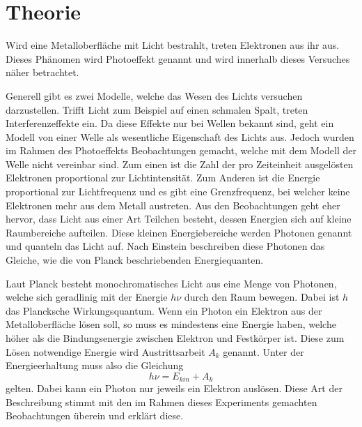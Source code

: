\section{Theorie}
\label{sec:Theorie}
Wird eine Metalloberfläche mit Licht bestrahlt, treten Elektronen aus ihr aus. Dieses Phänomen wird Photoeffekt genannt und wird innerhalb dieses Versuches näher betrachtet.

Generell gibt es zwei Modelle, welche das Wesen des Lichts versuchen darzustellen. Trifft Licht zum Beispiel auf einen schmalen Spalt, treten Interferenzeffekte ein. Da diese Effekte nur bei Wellen bekannt sind, geht ein Modell von einer Welle als wesentliche Eigenschaft des Lichts aus.
Jedoch wurden im Rahmen des Photoeffekts Beobachtungen gemacht, welche mit dem Modell der Welle nicht vereinbar sind. Zum einen ist die Zahl der pro Zeiteinheit ausgelösten Elektronen proportional zur Lichtintensität. Zum Anderen ist die Energie proportional zur Lichtfrequenz und es gibt eine Grenzfrequenz, bei welcher keine Elektronen mehr aus dem Metall austreten. Aus den Beobachtungen geht eher hervor, dass Licht aus einer Art Teilchen besteht, dessen Energien sich auf kleine Raumbereiche aufteilen. Diese kleinen Energiebereiche werden Photonen genannt und quanteln das Licht auf. Nach Einstein beschreiben diese Photonen das Gleiche, wie die von Planck beschriebenden Energiequanten. 

Laut Planck besteht monochromatisches Licht aus eine Menge von Photonen, welche sich geradlinig mit der Energie $h\nu$ durch den Raum bewegen. Dabei ist $h$ das Plancksche Wirkungsquantum. Wenn ein Photon ein Elektron aus der Metalloberfläche lösen soll, so muss es mindestens eine Energie haben, welche höher als die Bindungsenergie zwischen Elektron und Festkörper ist. Diese zum Lösen notwendige Energie wird Austrittsarbeit $A_k$ genannt. Unter der Energieerhaltung muss also die Gleichung
\begin{equation}
    h \nu = E_{kin} + A_k
\end{equation}
gelten. Dabei kann ein Photon nur jeweils ein Elektron auslösen. Diese Art der Beschreibung stimmt mit den im Rahmen dieses Experiments gemachten Beobachtungen überein und erklärt diese.




